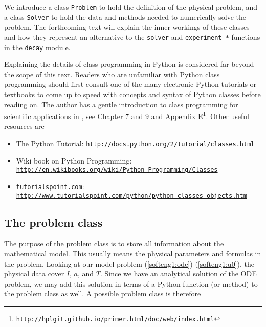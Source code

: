 \documentclass[graybox,sectrefs,envcountresetchap,open=right,final]{svmonodo}
\begin{document}
We introduce a class \texttt{Problem} to hold the definition of the physical
problem, and a class \texttt{Solver} to hold the data and methods needed to
numerically solve the problem.  The forthcoming text will explain the
inner workings of these classes and how they represent an alternative
to the \texttt{solver} and \Verb!experiment_*! functions in the \texttt{decay}
module.

Explaining the details of class programming in Python is considered
far beyond the scope of this text.  Readers who are unfamiliar with Python
class programming should first consult one of the many electronic
Python tutorials or textbooks to come up to speed with concepts and
syntax of Python classes before reading on. The author has a gentle
introduction to class programming for scientific applications
in \cite{Langtangen_2012}, see \href{{http://hplgit.github.io/primer.html/doc/web/index.html}}{Chapter 7 and 9 and Appendix E}\footnote{\texttt{http://hplgit.github.io/primer.html/doc/web/index.html}}.
Other useful resources are

\begin{itemize}
 \item The Python Tutorial: \href{{http://docs.python.org/2/tutorial/classes.html}}{\nolinkurl{http://docs.python.org/2/tutorial/classes.html}}

 \item Wiki book on Python Programming: \href{{http://en.wikibooks.org/wiki/Python_Programming/Classes}}{\nolinkurl{http://en.wikibooks.org/wiki/Python_Programming/Classes}}

 \item \texttt{tutorialspoint.com}: \href{{http://www.tutorialspoint.com/python/python_classes_objects.htm}}{\nolinkurl{http://www.tutorialspoint.com/python/python_classes_objects.htm}}
\end{itemize}

\noindent
\subsection{The problem class}


The purpose of the problem class is to store all information about
the mathematical model. This usually means the physical parameters
and formulas
in the problem. Looking at our model problem
(\ref{softeng1:ode})-(\ref{softeng1:u0}), the physical data cover
$I$, $a$, and $T$. Since we have an analytical solution of
the ODE problem, we may add this solution in terms of a Python
function (or method) to the problem class as well.
A possible problem class is therefore
\end{document}
